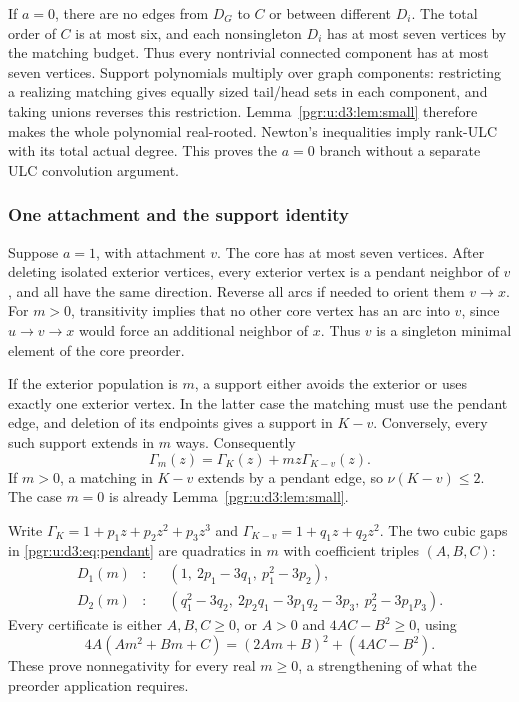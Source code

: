 \documentclass[11pt]{article}
\numberwithin{equation}{section}
\theoremstyle{definition}\newtheorem{definition}[theorem]{Definition}\newtheorem{remark}[theorem]{Remark}
\newcommand{\Ga}{\Gamma}                   %
\begin{document}
If $a=0$, there are no edges from $D_G$ to $C$ or between different $D_i$. The total order of $C$ is at most six, and each nonsingleton $D_i$ has at most seven vertices by the matching budget. Thus every nontrivial connected component has at most seven vertices. Support polynomials multiply over graph components: restricting a realizing matching gives equally sized tail/head sets in each component, and taking unions reverses this restriction. Lemma~\ref{pgr:u:d3:lem:small} therefore makes the whole polynomial real-rooted. Newton's inequalities imply rank-ULC with its total actual degree. This proves the $a=0$ branch without a separate ULC convolution argument.

\subsubsection{One attachment and the support identity}

Suppose $a=1$, with attachment $v$. The core has at most seven vertices. After deleting isolated exterior vertices, every exterior vertex is a pendant neighbor of $v$, and all have the same direction. Reverse all arcs if needed to orient them $v\to x$. For $m>0$, transitivity implies that no other core vertex has an arc into $v$, since $u\to v\to x$ would force an additional neighbor of $x$. Thus $v$ is a singleton minimal element of the core preorder.

If the exterior population is $m$, a support either avoids the exterior or uses exactly one exterior vertex. In the latter case the matching must use the pendant edge, and deletion of its endpoints gives a support in $K-v$. Conversely, every such support extends in $m$ ways. Consequently
\begin{equation}\label{pgr:u:d3:eq:pendant}
 \Ga_m(z)=\Ga_K(z)+mz\Ga_{K-v}(z).
\end{equation}
If $m>0$, a matching in $K-v$ extends by a pendant edge, so $\nu(K-v)\le2$. The case $m=0$ is already Lemma~\ref{pgr:u:d3:lem:small}.

Write $\Ga_K=1+p_1z+p_2z^2+p_3z^3$ and $\Ga_{K-v}=1+q_1z+q_2z^2$. The two cubic gaps in \eqref{pgr:u:d3:eq:pendant} are quadratics in $m$ with coefficient triples $(A,B,C)$:
\begin{align}
 D_1(m)&: &&(1,\ 2p_1-3q_1,\ p_1^2-3p_2),\label{pgr:u:d3:eq:pendant1}\\
 D_2(m)&: &&(q_1^2-3q_2,\ 2p_2q_1-3p_1q_2-3p_3,\ p_2^2-3p_1p_3).
 \label{pgr:u:d3:eq:pendant2}
\end{align}
Every certificate is either $A,B,C\ge0$, or $A>0$ and $4AC-B^2\ge0$, using
\begin{equation}\label{pgr:u:d3:eq:quadraticcert}
 4A(Am^2+Bm+C)=(2Am+B)^2+(4AC-B^2).
\end{equation}
These prove nonnegativity for every real $m\ge0$, a strengthening of what the preorder application requires.
\end{document}
